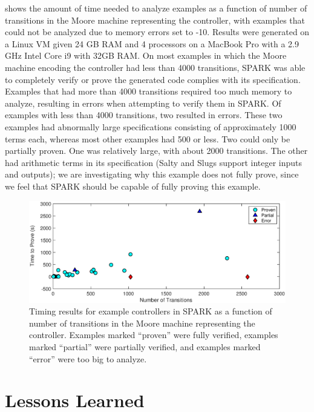 \documentclass[runningheads]{llncs}
\begin{document}
 shows the amount of time needed to analyze examples as a function of number of transitions in the Moore machine representing the controller, with examples that could not be analyzed due to memory errors set to -10.
Results were generated on a Linux VM given 24 GB RAM and 4 processors on a MacBook Pro with a 2.9 GHz Intel Core i9 with 32GB RAM.
On most examples in which the Moore machine encoding the controller had less than 4000 transitions, 
SPARK was able to completely verify or prove the generated code complies with its specification. 
Examples that had more than 4000 transitions required too much memory to analyze, resulting in errors when attempting to verify them in SPARK. 
Of examples with less than 4000 transitions, two resulted in errors. 
These two examples had abnormally large specifications consisting of approximately 1000 terms each, whereas most other examples had 500 or less.
Two could only be partially proven. 
One was relatively large, with about 2000 transitions. 
The other had arithmetic terms in its specification (Salty and Slugs support integer inputs and outputs); 
we are investigating why this example does not fully prove, 
since we feel that SPARK should be capable of fully proving this example.



\begin{figure}
\includegraphics[width=\textwidth]{salty.eps}
\caption{Timing results for example controllers in SPARK as a function of number of transitions in the Moore machine representing the controller. Examples marked ``proven'' were fully verified, examples marked ``partial'' were partially verified, and examples marked ``error'' were too big to analyze.}
\label{fig:timingResults}
\end{figure}


\section{Lessons Learned}
\label{sec:lessonsLearned}
\end{document}
